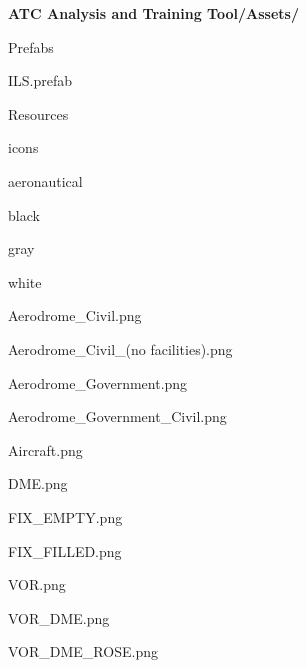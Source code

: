 \begin{minipage}[t]{0.6\textwidth}
\begin{footnotesize}
\faSend\ \textbf{ATC Analysis and Training Tool/Assets/}
	
\begin{description}
	\item \faFolderOpen\ Prefabs
	
	\begin{description}
		\item \faFileO\ ILS.prefab
	\end{description}	
	
	\item \faFolderOpen\ Resources
	
	\begin{description}
		\item \faFolderOpen\ icons
		
		\begin{description}
			\item \faFolderOpen\ aeronautical
			\begin{description}
				\item \faFolderO\ black
				\item \faFolderO\ gray
				\item \faFolderOpenO\ white
				
				\begin{description}
					\item \faFileImageO\ Aerodrome\_Civil.png
					\item \faFileImageO\ Aerodrome\_Civil\_(no facilities).png
					\item \faFileImageO\ Aerodrome\_Government.png
					\item \faFileImageO\ Aerodrome\_Government\_Civil.png
					\item \faFileImageO\ Aircraft.png
					\item \faFileImageO\ DME.png
					\item \faFileImageO\ FIX\_EMPTY.png
					\item \faFileImageO\ FIX\_FILLED.png
					\item \faFileImageO\ VOR.png
					\item \faFileImageO\ VOR\_DME.png
					\item \faFileImageO\ VOR\_DME\_ROSE.png
				\end{description}
			\end{description}
			
		\end{description}
	\end{description}


\end{description}
\end{footnotesize}
\end{minipage}

